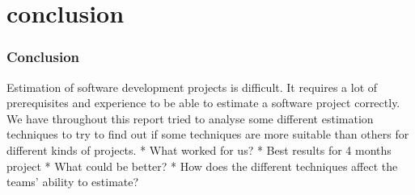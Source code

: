 \part{conclusion}
\section{Conclusion}
Estimation of software development projects is difficult. It requires a lot of prerequisites and experience to
be able to estimate a software project correctly. We have throughout this report tried to analyse some different
estimation techniques to try to find out if some techniques are more suitable than others for different kinds of
projects.
* What worked for us?
* Best results for 4 months project
* What could be better?
* How does the different techniques affect the teams' ability to estimate?
